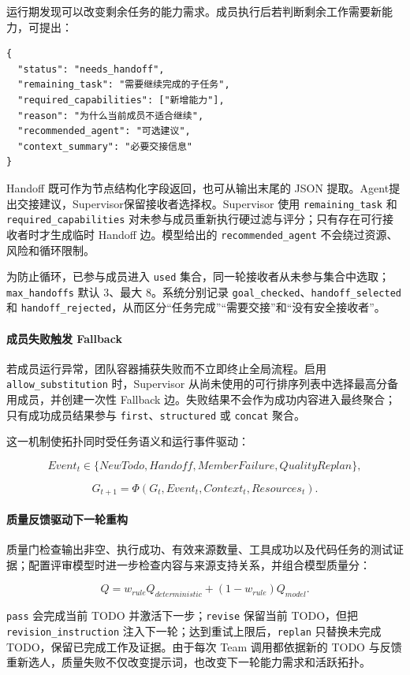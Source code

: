 运行期发现可以改变剩余任务的能力需求。成员执行后若判断剩余工作需要新能力，可提出：

\begin{verbatim}
{
  "status": "needs_handoff",
  "remaining_task": "需要继续完成的子任务",
  "required_capabilities": ["新增能力"],
  "reason": "为什么当前成员不适合继续",
  "recommended_agent": "可选建议",
  "context_summary": "必要交接信息"
}
\end{verbatim}

Handoff 既可作为节点结构化字段返回，也可从输出末尾的 JSON 提取。Agent提出交接建议，Supervisor保留接收者选择权。Supervisor 使用 \texttt{remaining\_task} 和 \texttt{required\_capabilities} 对未参与成员重新执行硬过滤与评分；只有存在可行接收者时才生成临时 Handoff 边。模型给出的 \texttt{recommended\_agent} 不会绕过资源、风险和循环限制。

为防止循环，已参与成员进入 \texttt{used} 集合，同一轮接收者从未参与集合中选取；\texttt{max\_handoffs} 默认 3、最大 8。系统分别记录 \texttt{goal\_checked}、\texttt{handoff\_selected} 和 \texttt{handoff\_rejected}，从而区分``任务完成''``需要交接''和``没有安全接收者''。

\paragraph{成员失败触发 Fallback}

若成员运行异常，团队容器捕获失败而不立即终止全局流程。启用 \texttt{allow\_substitution} 时，Supervisor 从尚未使用的可行排序列表中选择最高分备用成员，并创建一次性 Fallback 边。失败结果不会作为成功内容进入最终聚合；只有成功成员结果参与 \texttt{first}、\texttt{structured} 或 \texttt{concat} 聚合。

这一机制使拓扑同时受任务语义和运行事件驱动：

\[
Event_t\in\{NewTodo,Handoff,MemberFailure,QualityReplan\},
\]

\[
G_{t+1}=\Phi(G_t,Event_t,Context_t,Resources_t).
\]

\paragraph{质量反馈驱动下一轮重构}

质量门检查输出非空、执行成功、有效来源数量、工具成功以及代码任务的测试证据；配置评审模型时进一步检查内容与来源支持关系，并组合模型质量分：

\[
Q=w_{rule}Q_{deterministic}+(1-w_{rule})Q_{model}.
\]

\texttt{pass} 会完成当前 TODO 并激活下一步；\texttt{revise} 保留当前 TODO，但把 \texttt{revision\_instruction} 注入下一轮；达到重试上限后，\texttt{replan} 只替换未完成 TODO，保留已完成工作及证据。由于每次 Team 调用都依据新的 TODO 与反馈重新选人，质量失败不仅改变提示词，也改变下一轮能力需求和活跃拓扑。

